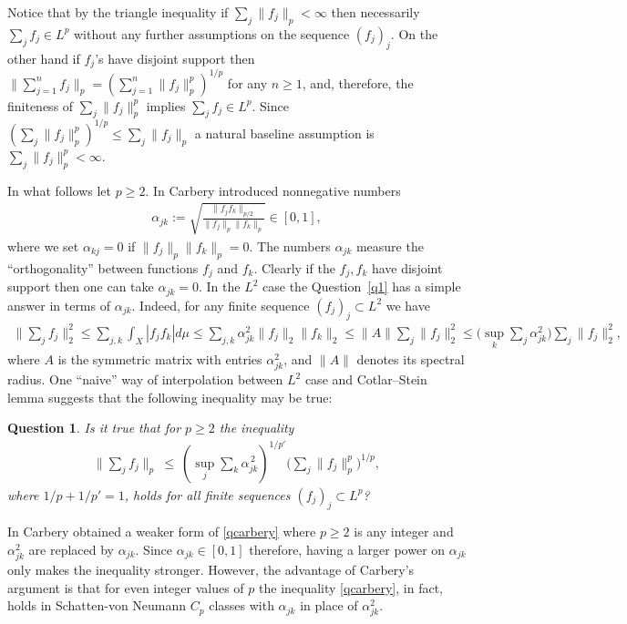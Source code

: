 \documentclass[11pt]{article}
\newtheorem{question}{Question}
\theoremstyle{definition}
\newcommand{\1}{\mathbf{1}}
\begin{document}
Notice that by the triangle inequality if $\sum_{j} \|f_{j}\|_{p}<\infty$ then necessarily $\sum_{j} f_{j} \in L^{p}$ without any further assumptions on the sequence $(f_{j})_{j}$. On the other hand if $f_{j}$'s have disjoint support then $\|\sum_{j=1}^{n} f_{j}\|_{p} = \left(\sum_{j=1}^{n} \|f_{j}\|_{p}^{p}\right)^{1/p}$ for any $n\geq 1$,  and, therefore, the finiteness of $\sum_{j} \|f_{j}\|_{p}^{p}$ implies $\sum_{j} f_{j} \in L^{p}$. Since $\left(\sum_{j} \|f_{j}\|_{p}^{p}\right)^{1/p}\leq \sum_{j} \|f_{j}\|_{p}$ a natural baseline assumption is $\sum_{j}\|f_{j}\|_{p}^{p} <\infty$. 

In what follows let $p\geq 2$. In \cite{Carbery2009} Carbery introduced nonnegative numbers 
\begin{align*}
    \alpha_{jk} := \sqrt{\frac{\|f_{j}f_{k}\|_{p/2}}{\|f_{j}\|_{p}\|f_{k}\|_{p}}} \in [0,1],
\end{align*}
where we set $\alpha_{kj}=0$ if  $\|f_{j}\|_{p} \|f_{k}\|_{p}=0$. The numbers $\alpha_{jk}$ measure the ``orthogonality'' between functions $f_{j}$ and $f_{k}$. Clearly if the $f_{j}, f_{k}$ have disjoint support then one can take $\alpha_{jk}=0$. 
In the $L^{2}$ case the Question~\ref{q1} has a simple answer in terms of $\alpha_{jk}$. Indeed, for any finite sequence $(f_{j})_{j} \subset L^{2}$ we have
\begin{align*}
    \Big\| \sum_{j} f_{j} \Big\|_{2}^{2} \leq  \sum_{j,k} \int_{X} |f_{j} f_{k}| d\mu \leq \sum_{j,k}  \alpha^{2}_{jk} \|f_{j}\|_{2} \|f_{k}\|_{2} \leq \|A\| \sum_{j} \|f_{j}\|_{2}^{2} \leq \Big(\sup_{k}\sum_{j}\alpha_{jk}^{2}\Big) \sum_{j}\|f_{j}\|_{2}^{2},
\end{align*}
where $A$ is the symmetric  matrix with entries $\alpha_{jk}^{2}$, and $\|A\|$ denotes its spectral radius. 
One ``naive'' way of interpolation between $L^{2}$ case and Cotlar--Stein lemma suggests that the following inequality may be true:

\begin{question}
Is it true that for $p\geq 2$ the inequality 
\begin{align}\label{qcarbery}
\Big\|\sum_j f_j\Big\|_p \ \le\  \left(\sup_{j} \sum_{k} \alpha_{jk}^{\,2}\right)^{1/p'} \Big(\sum_j \|f_j\|_p^p\Big)^{1/p},
\end{align}
where $1/p+1/p'=1$,
holds for all finite sequences $(f_{j})_{j}\subset L^{p}$? 
\end{question}



In \cite{Carbery2009} Carbery obtained a weaker form of \eqref{qcarbery} where $p\geq 2$ is any integer and $\alpha_{jk}^{2}$ are replaced by $\alpha_{jk}$. Since $\alpha_{jk}\in [0,1]$ therefore, having a larger power on $\alpha_{jk}$ only makes the inequality stronger. However, the advantage of Carbery's argument is that for even integer values of $p$ the inequality \eqref{qcarbery}, in fact, holds in Schatten-von Neumann $C_{p}$  classes with $\alpha_{jk}$ in place of $\alpha_{jk}^{2}$. 
\end{document}
